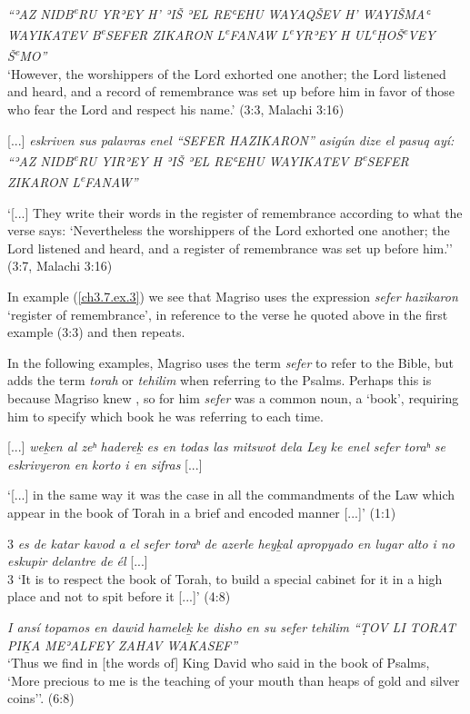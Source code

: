 \documentclass[output=paper,colorlinks,citecolor=brown,babel,arabicfont]{langscibook}
\begin{document}
\ea \label{ch3.7.ex.2}
\textit{{``}ʾAZ NIDB\textsuperscript{e}RU YRʾEY H' ʾIŠ ʾEL REʿEHU WAYAQŠEV H' WAYIŠMAʿ WAYIKATEV B\textsuperscript{e}SEFER ZIKARON L\textsuperscript{e}FANAW L\textsuperscript{e}YRʾEY H UL\textsuperscript{e}ḤOŠ\textsuperscript{e}VEY Š\textsuperscript{e}MO''} \\
`However, the worshippers of the Lord exhorted one another; the Lord listened and heard, and a record of remembrance was set up before him in favor of those who fear the Lord and respect his name.' (3:3, Malachi 3:16)
\z

\ea \label{ch3.7.ex.3}
{[...]} \textit{eskriven sus palavras enel ``SEFER HAZIKARON'' asigún dize el pasuq ayí: ``ʾAZ NIDB\textsuperscript{e}RU YIRʾEY H ʾIŠ ʾEL REʿEHU WAYIKATEV B\textsuperscript{e}SEFER ZIKARON L\textsuperscript{e}FANAW''}

`{[...]} They write their words in the register of remembrance according to what the verse says: `Nevertheless the worshippers of the Lord exhorted one another; the Lord listened and heard, and a register of remembrance was set up before him.'' (3:7, Malachi 3:16) 
\z

In example (\ref{ch3.7.ex.3}) we see that Magriso uses the expression \textit{sefer hazikaron} `register of remembrance', in reference to the verse he quoted above in the first example (3:3) and then repeats. 

In the following examples, Magriso uses the term \textit{sefer} to refer to the Bible, but adds the term \textit{torah} or \textit{tehilim} when referring to the Psalms. Perhaps this is because Magriso knew , so for him \textit{sefer} was a common noun, a `book', requiring him to specify which book he was referring to each time.

\ea \label{ch3.7.ex.4}
{[...]} \textit{we\b{k}en al zeʰ hadere\b{k} es en todas las mitswot dela Ley ke enel sefer toraʰ se eskrivyeron en korto i en sifras} {[...]} 

`{[...]} in the same way it was the case in all the commandments of the Law which appear in the book of Torah in a brief and encoded manner {[...]}' (1:1)
\z

\newpage
\ea \label{ch3.7.ex.5}
3 \textit{es de katar kavod a el sefer toraʰ de azerle hey\b{k}al apropyado en lugar alto i no eskupir delantre de él} {[...]} \\
3 `It is to respect the book of Torah, to build a special cabinet for it in a high place and not to spit before it {[...]}' (4:8)
\z

\ea\label{ch3.7.ex.6}
\textit{I ansí topamos en dawid hamele\b{k} ke disho en su sefer tehilim ``ṬOV LI TORAT PI\b{K}A MEʾALFEY ZAHAV WAKASEF''}\\
`Thus we find in [the words of] King David who said in the book of Psalms, `More precious to me is the teaching of your mouth than heaps of gold and silver coins''. (6:8)
\z
\end{document}
